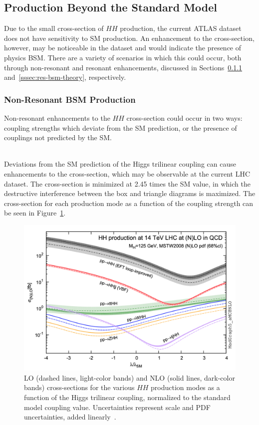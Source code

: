 \subsection{Production Beyond the Standard Model}

Due to the small cross-section of $HH$ production, the current ATLAS dataset does not have sensitivity to \gls{SM} production. An enhancement to the cross-section, however, may be noticeable in the dataset and would indicate the presence of physics \gls{BSM}. There are a variety of scenarios in which this could occur, both through non-resonant and resonant enhancements, discussed in Sections~\ref{sssec:nonres-bsm-theory} and~\ref{sssec:res-bsm-theory}, respectively.

\subsubsection{Non-Resonant BSM Production}\label{sssec:nonres-bsm-theory}

Non-resonant enhancements to the $HH$ cross-section could occur in two ways: coupling strengths which deviate from the \gls{SM} prediction, or the presence of couplings not predicted by the \gls{SM}.

\noindent{${\boldsymbol \kappa_{\lambda}}$}\\
\indent Deviations from the \gls{SM} prediction of the Higgs trilinear coupling can cause enhancements to the cross-section, which may be observable at the current \gls{LHC} dataset. The cross-section is minimized at 2.45 times the \gls{SM} value, in which the destructive interference between the box and triangle diagrams is maximized. The cross-section for each production mode as a function of the coupling strength can be seen in Figure~\ref{fig:klambda-xsec}.

\begin{figure}[!ht]
    \centering
    \includegraphics[width=.7\textwidth]{chapters/chapter1_theory/images/klambda-xsec.png}
    \caption[LO and NLO cross-sections for the various \hh production modes as a function of the Higgs trilinear coupling]{\gls{LO} (dashed lines, light-color bands) and \gls{NLO} (solid lines, dark-color bands) cross-sections for the various $HH$ production modes as a function of the Higgs trilinear coupling, normalized to the standard model coupling value. Uncertainties represent scale and PDF uncertainties, added linearly~\cite{klambda-xsec}.}
    \label{fig:klambda-xsec}
\end{figure}

